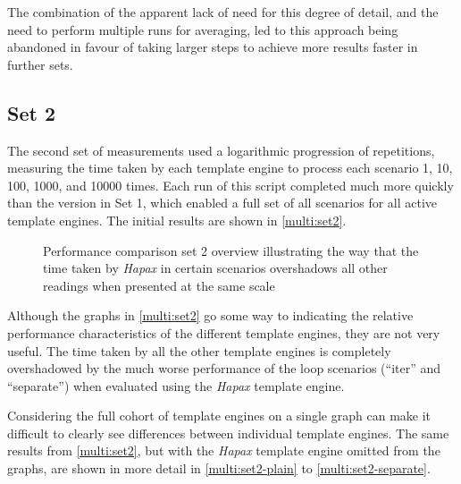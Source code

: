 The combination of the apparent lack of need for this degree of detail, and the need to perform multiple runs for averaging, led to this approach being abandoned in favour of taking larger steps to achieve more results faster in further sets.

\subsection{Set 2}
\label{comp:set 2}

The second set of measurements used a logarithmic progression of repetitions, measuring the time taken by each \gls{template engine} to process each scenario 1, 10, 100, 1000, and 10000 times. Each run of this script completed much more quickly than the version in Set 1, which enabled a full set of all scenarios for all active \gls{template engine}s. The initial results are shown in \autoref{multi:set2}.

\begin{figure}[!p]
\centering

\caption{\label{multi:set2}Performance comparison set 2 overview illustrating the way that the time taken by \emph{Hapax} in certain scenarios overshadows all other readings when presented at the same scale}
\end{figure}

Although the graphs in \autoref{multi:set2} go some way to indicating the relative performance characteristics of the different \gls{template engine}s, they are not very useful. The time taken by all the other \gls{template engine}s is completely overshadowed by the much worse performance of the loop scenarios (\enquote{iter} and \enquote{separate}) when evaluated using the \emph{Hapax} \gls{template engine}.

\label{A148}
Considering the full cohort of template engines on a single graph can make it difficult to clearly see differences between individual template engines. The same results from \autoref{multi:set2}, but with the \emph{Hapax} \gls{template engine} omitted from the graphs, are shown in more detail in \autoref{multi:set2-plain} to \autoref{multi:set2-separate}.

